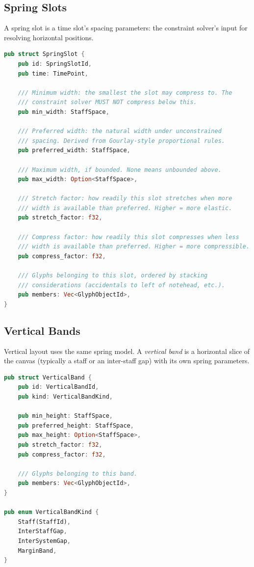 \documentclass[11pt,letterpaper]{report}
\begin{document}
\subsection{Spring Slots}

A spring slot is a time slot's spacing parameters: the constraint
solver's input for resolving horizontal positions.

\begin{lstlisting}[language=Rust]
pub struct SpringSlot {
    pub id: SpringSlotId,
    pub time: TimePoint,

    /// Minimum width: the smallest the slot may compress to. The
    /// constraint solver MUST NOT compress below this.
    pub min_width: StaffSpace,

    /// Preferred width: the natural width under unconstrained
    /// spacing. Derived from Gourlay-style proportional rules.
    pub preferred_width: StaffSpace,

    /// Maximum width, if bounded. None means unbounded above.
    pub max_width: Option<StaffSpace>,

    /// Stretch factor: how readily this slot stretches when more
    /// width is available than preferred. Higher = more elastic.
    pub stretch_factor: f32,

    /// Compress factor: how readily this slot compresses when less
    /// width is available than preferred. Higher = more compressible.
    pub compress_factor: f32,

    /// Glyphs belonging to this slot, ordered by stacking
    /// considerations (accidentals to left of notehead, etc.).
    pub members: Vec<GlyphObjectId>,
}
\end{lstlisting}

\subsection{Vertical Bands}

Vertical layout uses the same spring model. A \emph{vertical band}
is a horizontal slice of the canvas (typically a staff or an
inter-staff gap) with its own spring parameters.

\begin{lstlisting}[language=Rust]
pub struct VerticalBand {
    pub id: VerticalBandId,
    pub kind: VerticalBandKind,

    pub min_height: StaffSpace,
    pub preferred_height: StaffSpace,
    pub max_height: Option<StaffSpace>,
    pub stretch_factor: f32,
    pub compress_factor: f32,

    /// Glyphs belonging to this band.
    pub members: Vec<GlyphObjectId>,
}

pub enum VerticalBandKind {
    Staff(StaffId),
    InterStaffGap,
    InterSystemGap,
    MarginBand,
}
\end{lstlisting}
\end{document}
